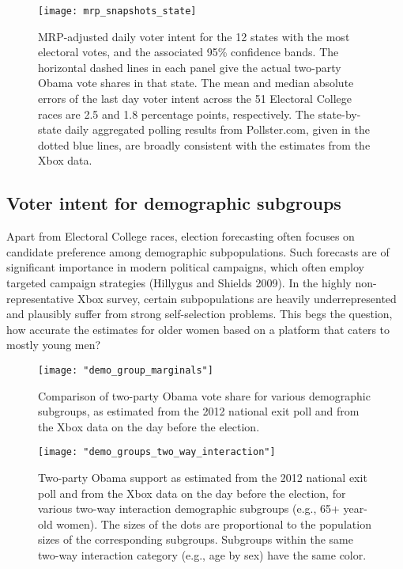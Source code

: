 \begin{figure}[p!]
  \centering
  \texttt{[image: mrp\_snapshots\_state]}
  \caption{MRP-adjusted daily voter intent for the 12 states with the most electoral
    votes, and the associated 95\% confidence bands. The horizontal dashed lines
    in each panel give the actual two-party Obama vote shares in that
    state. The mean and median absolute errors of the last day voter intent
    across the 51 Electoral College races are 2.5 and 1.8 percentage points,
    respectively. The state-by-state daily aggregated polling results from
    Pollster.com, given in the dotted blue lines, are broadly consistent with
    the estimates from the Xbox data.}
  \label{fig:state_snap}
\end{figure}

\subsection{Voter intent for demographic
subgroups}\label{voter-intent-for-demographic-subgroups}

Apart from Electoral College races, election forecasting often focuses
on candidate preference among demographic subpopulations. Such forecasts
are of significant importance in modern political campaigns, which often
employ targeted campaign strategies (Hillygus and Shields 2009). In the
highly non-representative Xbox survey, certain subpopulations are
heavily underrepresented and plausibly suffer from strong self-selection
problems. This begs the question, how accurate the estimates for older
women based on a platform that caters to mostly young men?

\begin{figure} \centering
  \texttt{[image: "demo\_group\_marginals"]} \caption{Comparison
  of two-party Obama vote share for various demographic subgroups, as estimated
  from the 2012 national exit poll and from the Xbox data on the day before the
  election.  } \label{fig:marginal_comp} \end{figure}

\begin{figure}
  \centering
  \texttt{[image: "demo\_groups\_two\_way\_interaction"]}
  \caption{Two-party Obama support as estimated from
  the 2012 national exit poll and from the Xbox data on the day before the election,
    for various two-way interaction demographic subgroups (e.g., 65+ year-old women).
    The sizes of the dots are proportional to the
    population sizes of the corresponding subgroups. Subgroups within the same
    two-way interaction category (e.g., age by sex) have the same color.}
  \label{fig:two_way_comp}
\end{figure}

